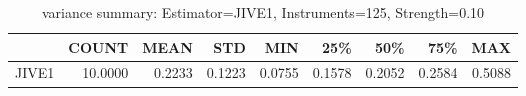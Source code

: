 \begin{table}[ht]
\centering
\caption{variance summary: Estimator=JIVE1, Instruments=125, Strength=0.10}
\begin{tabular}{lrrrrrrrr}
\toprule
 & COUNT & MEAN & STD & MIN & 25\% & 50\% & 75\% & MAX \\
\midrule
JIVE1 & 10.0000 & 0.2233 & 0.1223 & 0.0755 & 0.1578 & 0.2052 & 0.2584 & 0.5088 \\
\bottomrule
\end{tabular}
\end{table}
